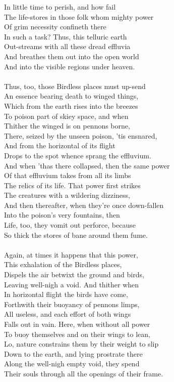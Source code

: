 In little time to perish, and how fail\\
The life-stores in those folk whom mighty power\\
Of grim necessity confineth there\\
In such a task? Thus, this telluric earth\\
Out-streams with all these dread effluvia\\
And breathes them out into the open world\\
And into the visible regions under heaven.\\
\\
Thus, too, those Birdless places must up-send\\
An essence bearing death to winged things,\\
Which from the earth rises into the breezes\\
To poison part of skiey space, and when\\
Thither the winged is on pennons borne,\\
There, seized by the unseen poison, 'tis ensnared,\\
And from the horizontal of its flight\\
Drops to the spot whence sprang the effluvium.\\
And when 'thas there collapsed, then the same power\\
Of that effluvium takes from all its limbs\\
The relics of its life. That power first strikes\\
The creatures with a wildering dizziness,\\
And then thereafter, when they're once down-fallen\\
Into the poison's very fountains, then\\
Life, too, they vomit out perforce, because\\
So thick the stores of bane around them fume.\\
\\
Again, at times it happens that this power,\\
This exhalation of the Birdless places,\\
Dispels the air betwixt the ground and birds,\\
Leaving well-nigh a void. And thither when\\
In horizontal flight the birds have come,\\
Forthwith their buoyancy of pennons limps,\\
All useless, and each effort of both wings\\
Falls out in vain. Here, when without all power\\
To buoy themselves and on their wings to lean,\\
Lo, nature constrains them by their weight to slip\\
Down to the earth, and lying prostrate there\\
Along the well-nigh empty void, they spend\\
Their souls through all the openings of their frame.

